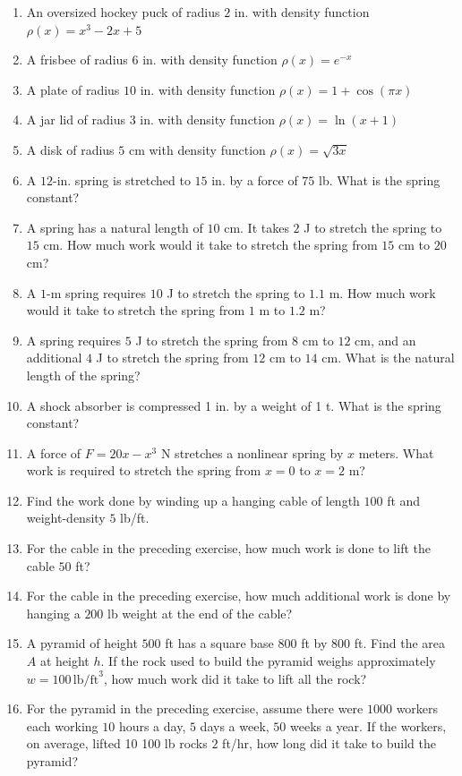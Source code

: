 \documentclass{exercises}
\begin{document}
\begin{enumerate}[resume]
\item An oversized hockey puck of radius $2$ in. with density function $\rho(x)=x^{3}-2x+5$
\item A frisbee of radius $6$ in. with density function $\rho(x)=e^{-x}$
\item A plate of radius $10$ in. with density function $\rho(x)=1+\cos(\pi x)$
\item A jar lid of radius $3$ in. with density function $\rho(x)=\ln(x+1)$
\item A disk of radius $5$ cm with density function $\rho(x)=\sqrt{3x}$
\item A $12$-in. spring is stretched to $15$ in. by a force of $75$ lb. What is the spring constant?
\item A spring has a natural length of $10$ cm. It takes $2$ J to stretch the spring to $15$ cm. How much work would it take to stretch the spring from $15$ cm to $20$ cm?
\item A $1$-m spring requires $10$ J to stretch the spring to $1.1$ m. How much work would it take to stretch the spring from $1$ m to $1.2$ m?
\item A spring requires $5$ J to stretch the spring from $8$ cm to $12$ cm, and an additional $4$ J to stretch the spring from $12$ cm to $14$ cm. What is the natural length of the spring?
\item A shock absorber is compressed 1 in. by a weight of 1 t. What is the spring constant?
\item A force of $F=20x-x^{3}$ N stretches a nonlinear spring by $x$ meters. What work is required to stretch the spring from $x=0$ to $x=2$ m?
\item Find the work done by winding up a hanging cable of length $100$ ft and weight-density $5$ lb/ft.
\item For the cable in the preceding exercise, how much work is done to lift the cable $50$ ft?
\item For the cable in the preceding exercise, how much additional work is done by hanging a $200$ lb weight at the end of the cable?
\item \techrequired A pyramid of height $500$ ft has a square base $800$ ft by $800$ ft. Find the area $A$ at height $h$. If the rock used to build the pyramid weighs approximately $w=100\,\text{lb/ft}^{3}$, how much work did it take to lift all the rock?
\item \techrequired For the pyramid in the preceding exercise, assume there were $1000$ workers each working $10$ hours a day, $5$ days a week, $50$ weeks a year. If the workers, on average, lifted 10 100 lb rocks $2$ ft/hr, how long did it take to build the pyramid?

\end{enumerate}
\end{document}

